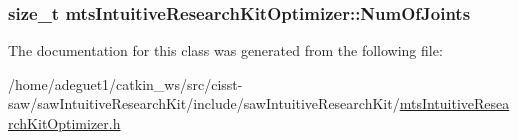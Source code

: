\hypertarget{classmts_intuitive_research_kit_optimizer_aa64f574f639972c9ef2ce46db04c48f6}{
\subsubsection[{Num\-Of\-Joints}]{\setlength{\rightskip}{0pt plus 5cm}size\-\_\-t mts\-Intuitive\-Research\-Kit\-Optimizer\-::\-Num\-Of\-Joints\hspace{0.3cm}{\ttfamily [protected]}}}\label{classmts_intuitive_research_kit_optimizer_aa64f574f639972c9ef2ce46db04c48f6}


The documentation for this class was generated from the following file\-:\begin{DoxyCompactItemize}
\item 
/home/adeguet1/catkin\-\_\-ws/src/cisst-\/saw/saw\-Intuitive\-Research\-Kit/include/saw\-Intuitive\-Research\-Kit/\hyperlink{mts_intuitive_research_kit_optimizer_8h}{mts\-Intuitive\-Research\-Kit\-Optimizer.\-h}\end{DoxyCompactItemize}

